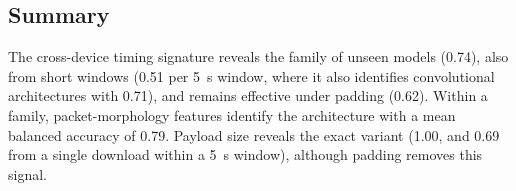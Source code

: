 \subsection{Summary}
The cross-device timing signature reveals the family of unseen models (0.74),
also from short windows (0.51 per 5~s window, where it also identifies
convolutional architectures with 0.71), and remains effective under padding
(0.62). Within a family, packet-morphology features identify the architecture
with a mean balanced accuracy of 0.79. Payload size reveals the exact variant
(1.00, and 0.69 from a single download within a 5~s window), although padding
removes this signal.
